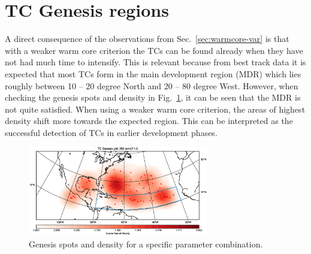 \section{TC Genesis regions}
A direct consequence of the observations from Sec.~\ref{sec:warmcore-var} is that with a weaker warm core criterion the TCs can be found already when they have not had much time to intensify. This is relevant because from best track data it is expected that most TCs form in the main development region (MDR) which lies roughly between 10 -- 20 degree North and 20 -- 80 degree West. However, when checking the genesis spots and density in Fig.~\ref{fig:genesis-temdif1}, it can be seen that the MDR is not quite satisfied. When using a weaker warm core criterion, the areas of highest density shift more towards the expected region. This can be interpreted as the successful detection of TCs in earlier development phases. 
\begin{figure}[ht]
	\centering
	\includegraphics[width=0.7\textwidth]{img/genesis_plot_temdif1.eps}
	\caption{Genesis spots and density for a specific parameter combination.}
	\label{fig:genesis-temdif1}
\end{figure}



